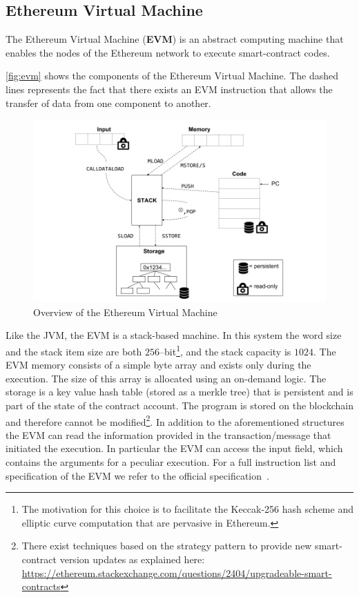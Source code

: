 \subsection{Ethereum Virtual Machine}
\label{sec:evm}
The Ethereum Virtual Machine (\textbf{EVM}) is an abstract computing machine
that enables the nodes of the Ethereum network to execute smart-contract
codes.


\autoref{fig:evm} shows the components of the Ethereum Virtual Machine.
The dashed lines represents the fact that there exists an EVM instruction
that allows the transfer of data from one component to another.
\begin{figure}
	\begin{center}
		\includegraphics[width=\textwidth]
        {./res/img/architecture/evm/EVM.png}
	\end{center}
	\caption{Overview of the Ethereum Virtual Machine}
	\label{fig:evm}
\end{figure}
Like the JVM, the EVM is a stack-based machine. In this system the word size
and the stack item size are both $256$--bit\footnote{The motivation
for this choice is to facilitate the Keccak-256 hash scheme and elliptic
curve computation that are pervasive in Ethereum.},
and the stack capacity is $1024$.
The EVM memory consists of a simple byte array and exists only during the
execution. The size of this array is allocated using an on-demand logic.
The storage is a key value hash table (stored as a merkle tree) that is
persistent and is part of the state of the contract account.
The program is stored on the blockchain and therefore cannot
be modified\footnote{There exist
techniques based on the strategy pattern to provide new smart-contract version
updates as explained here:
\url{https://ethereum.stackexchange.com/questions/2404/upgradeable-smart-contracts}}.
In addition to the aforementioned structures the EVM can read the information
provided in the transaction/message that initiated the execution. In particular
the EVM can access the input field, which contains the arguments for a peculiar
execution.
For a full instruction list and specification of the EVM
we refer to the official specification~\cite{wood2018ethereum}.


